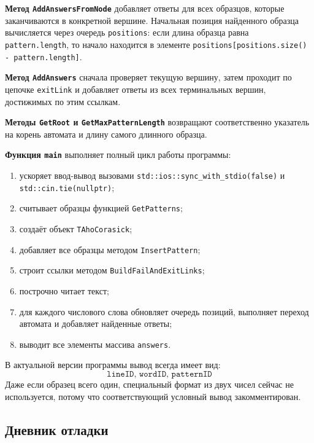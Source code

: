 \documentclass[12pt]{article}
\begin{document}
\textbf{Метод \texttt{AddAnswersFromNode}} добавляет ответы для всех образцов, которые заканчиваются в конкретной вершине. Начальная позиция найденного образца вычисляется через очередь \texttt{positions}: если длина образца равна \texttt{pattern.length}, то начало находится в элементе \texttt{positions[positions.size() - pattern.length]}.

\textbf{Метод \texttt{AddAnswers}} сначала проверяет текущую вершину, затем проходит по цепочке \texttt{exitLink} и добавляет ответы из всех терминальных вершин, достижимых по этим ссылкам.

\textbf{Методы \texttt{GetRoot} и \texttt{GetMaxPatternLength}} возвращают соответственно указатель на корень автомата и длину самого длинного образца.

\textbf{Функция \texttt{main}} выполняет полный цикл работы программы:
\begin{enumerate}
    \item ускоряет ввод-вывод вызовами \texttt{std::ios::sync\_with\_stdio(false)} и \texttt{std::cin.tie(nullptr)};
    \item считывает образцы функцией \texttt{GetPatterns};
    \item создаёт объект \texttt{TAhoCorasick};
    \item добавляет все образцы методом \texttt{InsertPattern};
    \item строит ссылки методом \texttt{BuildFailAndExitLinks};
    \item построчно читает текст;
    \item для каждого числового слова обновляет очередь позиций, выполняет переход автомата и добавляет найденные ответы;
    \item выводит все элементы массива \texttt{answers}.
\end{enumerate}

В актуальной версии программы вывод всегда имеет вид:
\[
\texttt{lineID, wordID, patternID}
\]
Даже если образец всего один, специальный формат из двух чисел сейчас не используется, потому что соответствующий условный вывод закомментирован.

\subsection*{Дневник отладки}
\end{document}
